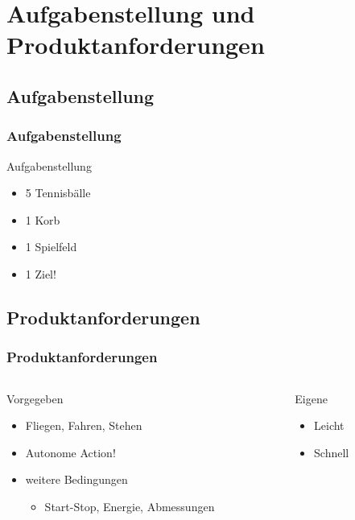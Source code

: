 \section{Aufgabenstellung und Produktanforderungen} %
\subsection{Aufgabenstellung}
\begin{frame}
    \frametitle{Aufgabenstellung}
	\begin{block}{Aufgabenstellung}
	    \begin{itemize}
	    	\item 5 Tennisbälle
	    	\item 1 Korb
		    \item 1 Spielfeld
		    \item 1 Ziel!
	    \end{itemize}
    \end{block}
\end{frame}
\subsection{Produktanforderungen}
\begin{frame}
    \frametitle{Produktanforderungen}
    \begin{columns}
        \begin{column}{0.5\textwidth}
            \begin{block}{Vorgegeben}
                 \begin{itemize}
                    \item Fliegen, Fahren, Stehen
                    \item Autonome Action!
                    \item weitere Bedingungen
                    \begin{itemize}
                        \item Start-Stop, Energie, Abmessungen
                    \end{itemize}
                 \end{itemize}
            \end{block}
        \end{column}
        \begin{column}{0.5\textwidth}
            \begin{block}{Eigene}
                 \begin{itemize}
                    \item Leicht
                    \item Schnell                    
                 \end{itemize}
            \end{block}
        \end{column}
    \end{columns}
\end{frame}
